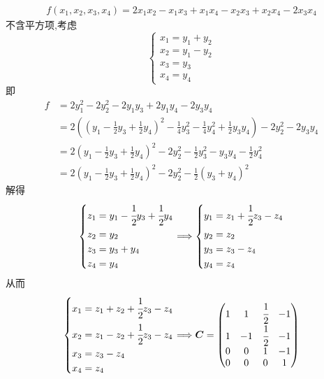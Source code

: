 \begin{brown}
    \begin{example}
        \begin{align*}
            f\left(
            x_1,x_2,x_3,x_4
            \right)=2x_1x_2-x_1x_3+x_1x_4-x_2x_3+x_2x_4-2x_3x_4
        \end{align*}不含平方项,考虑\[
        \begin{cases*}
            x_1=y_1+y_2\\
            x_2=y_1-y_2\\
            x_3=y_3\\
            x_4=y_4
        \end{cases*}
        \]即\begin{align*}
            f&=2y_1^2-2y_2^2-2y_1y_3+2y_1y_4-2y_3y_4\\
            &=2\left(
                \left(
                    y_1-\frac{1}{2}y_3+\frac{1}{2}y_4
                \right)^2-\frac{1}{4}y_3^2-\frac{1}{4}y_4^2+\frac{1}{2}y_3y_4
            \right)-2y_2^2-2y_3y_4\\
            &=2\left(
                y_1-\frac{1}{2}y_3+\frac{1}{2}y_4
            \right)^2-2y_2^2-\frac{1}{2}y_3^2-y_3y_4-\frac{1}{2}y_4^2\\
            &=2\left(
                y_1-\frac{1}{2}y_3+\frac{1}{2}y_4
            \right)^2-2y_2^2-\frac{1}{2}\left(
                y_3+y_4
            \right)^2
        \end{align*}解得\[
        \begin{cases*}
            z_1=y_1-\cfrac{1}{2}y_3+\cfrac{1}{2}y_4\\
            z_2=y_2\\
            z_3=y_3+y_4\\
            z_4=y_4
        \end{cases*}\Longrightarrow\begin{cases*}
            y_1=z_1+\cfrac{1}{2}z_3-z_4\\
            y_2=z_2\\
            y_3=z_3-z_4\\
            y_4=z_4
        \end{cases*}
        \]从而\[
        \begin{cases*}
               x_1=z_1+z_2+\cfrac{1}{2}z_3-z_4\\
                x_2=z_1-z_2+\cfrac{1}{2}z_3-z_4\\
                x_3=z_3-z_4\\
                x_4=z_4  
        \end{cases*}\Longrightarrow\bm{C}=\begin{pmatrix}
            1&1&\cfrac{1}{2}&-1\\
            1&-1&\cfrac{1}{2}&-1\\
            0&0&1&-1\\
            0&0&0&1
        \end{pmatrix}
        \]
    \end{example}
\end{brown}
